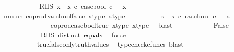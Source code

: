 \begin{isabellebody}
\ \ \ \ \ \ \ \ \isamarkupfalse%
\ \isamarkupfalse%
\ RHS{\isacharcolon}{\kern0pt}\ {\isachardoublequoteopen}{\isacharparenleft}{\kern0pt}x{}\ {\isasymamalg}\ x{}\ {\isasymcirc}\isactrlsub c\ case{\isacharunderscore}{\kern0pt}bool{\isacharparenright}{\kern0pt}\ {\isasymcirc}\isactrlsub c\ {\isasymomega}{}\ {\isacharequal}{\kern0pt}\ x{}{\isachardoublequoteclose}\isanewline
\ \ \ \ \ \ \ \ \ \ \isamarkupfalse%
\ {\isacharparenleft}{\kern0pt}meson\ coprod{\isacharunderscore}{\kern0pt}case{\isacharunderscore}{\kern0pt}bool{\isacharunderscore}{\kern0pt}false\ x{}{\isacharunderscore}{\kern0pt}type\ x{}{\isacharunderscore}{\kern0pt}type{\isacharparenright}{\kern0pt}\isanewline
\ \ \ \ \ \ \ \ \isamarkupfalse%
\ {\isachardoublequoteopen}{\isacharparenleft}{\kern0pt}x{}\ {\isasymamalg}\ x{}\ {\isasymcirc}\isactrlsub c\ case{\isacharunderscore}{\kern0pt}bool{\isacharparenright}{\kern0pt}\ {\isasymcirc}\isactrlsub c\ {\isasymomega}{}\ {\isacharequal}{\kern0pt}\ x{}{\isachardoublequoteclose}\isanewline
\ \ \ \ \ \ \ \ \ \ \isamarkupfalse%
\ {\isacartoucheopen}{\isasymomega}{}\ {\isacharequal}{\kern0pt}\ {\isasymt}{\isacartoucheclose}\ coprod{\isacharunderscore}{\kern0pt}case{\isacharunderscore}{\kern0pt}bool{\isacharunderscore}{\kern0pt}true\ x{}{\isacharunderscore}{\kern0pt}type\ x{}{\isacharunderscore}{\kern0pt}type\ \isamarkupfalse%
\ blast\isanewline
\ \ \ \ \ \ \ \ \isamarkupfalse%
\ \isamarkupfalse%
\ False\isanewline
\ \ \ \ \ \ \ \ \ \ \isamarkupfalse%
\ RHS\ distinct\ equals\ \isamarkupfalse%
\ force\isanewline
\ \ \ \ \ \ \isamarkupfalse%
\isanewline
\ \ \ \ \isamarkupfalse%
\isanewline
\ \ \ \ \ \ \isamarkupfalse%
\ {\isachardoublequoteopen}{\isasymomega}{}\ {\isasymnoteq}\ {\isasymt}{\isachardoublequoteclose}\isanewline
\ \ \ \ \ \ \isamarkupfalse%
\ \isamarkupfalse%
\ {\isachardoublequoteopen}{\isasymomega}{}\ {\isacharequal}{\kern0pt}\ {\isasymf}{\isachardoublequoteclose}\isanewline
\ \ \ \ \ \ \ \ \isamarkupfalse%
\ \ true{\isacharunderscore}{\kern0pt}false{\isacharunderscore}{\kern0pt}only{\isacharunderscore}{\kern0pt}truth{\isacharunderscore}{\kern0pt}values\ \isamarkupfalse%
\ {\isacharparenleft}{\kern0pt}typecheck{\isacharunderscore}{\kern0pt}cfuncs{\isacharcomma}{\kern0pt}\ blast{\isacharparenright}{\kern0pt}\isanewline

\end{isabellebody}
